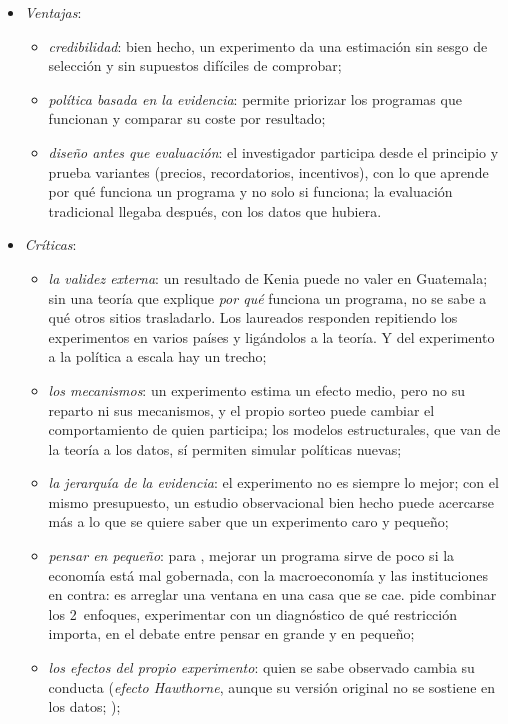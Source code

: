 \documentclass[11pt]{article}
\begin{document}
\begin{itemize}
\item \emph{Ventajas}:
  \begin{itemize}
  \item \emph{credibilidad}: bien hecho, un experimento da una estimación sin sesgo de selección y sin supuestos difíciles de comprobar;
  \item \emph{política basada en la evidencia}: permite priorizar los programas que funcionan y comparar su coste por resultado;
  \item \emph{diseño antes que evaluación}: el investigador participa desde el principio y prueba variantes (precios, recordatorios, incentivos), con lo que aprende por qué funciona un programa y no solo si funciona; la evaluación tradicional llegaba después, con los datos que hubiera.
  \end{itemize}
\item \emph{Críticas}:
  \begin{itemize}
  \item \emph{la validez externa}: un resultado de Kenia puede no valer en Guatemala; sin una teoría que explique \emph{por qué} funciona un programa, no se sabe a qué otros sitios trasladarlo\nocite{Deaton2010,DeatonCartwright2018}. Los laureados responden repitiendo los experimentos en varios países y ligándolos a la teoría\nocite{BanerjeeDuflo2009}. Y del experimento a la política a escala hay un trecho;
  \item \emph{los mecanismos}: un experimento estima un efecto medio, pero no su reparto ni sus mecanismos, y el propio sorteo puede cambiar el comportamiento de quien participa\nocite{HeckmanSmith1995}; los modelos estructurales, que van de la teoría a los datos, sí permiten simular políticas nuevas;
  \item \emph{la jerarquía de la evidencia}: el experimento no es siempre lo mejor; con el mismo presupuesto, un estudio observacional bien hecho puede acercarse más a lo que se quiere saber que un experimento caro y pequeño\nocite{Ravallion2020};
  \item \emph{pensar en pequeño}: para \textcite{Deaton2010}, mejorar un programa sirve de poco si la economía está mal gobernada, con la macroeconomía y las instituciones en contra: es arreglar una ventana en una casa que se cae. \textcite{Rodrik2009} pide combinar los 2~enfoques, experimentar con un diagnóstico de qué restricción importa, en el debate entre pensar en grande y en pequeño\nocite{CohenEasterly2009};
  \item \emph{los efectos del propio experimento}: quien se sabe observado cambia su conducta (\emph{efecto Hawthorne}, aunque su versión original no se sostiene en los datos; \cite{LevittList2011});

\end{itemize}
\end{itemize}
\end{document}
